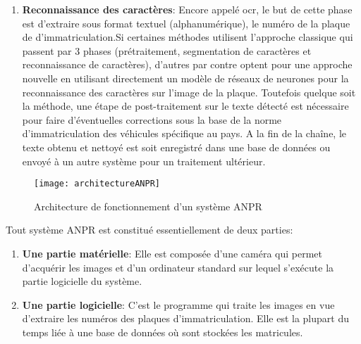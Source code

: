 \begin{enumerate}
\begin{itemize}
        \end{itemize}
    \item \textbf{Reconnaissance des caractères}: Encore appelé \acrshort{ocr}, le but de cette phase est d’extraire sous format textuel (alphanumérique), le numéro de la plaque de d’immatriculation.Si certaines méthodes \cite{krimMaster} \cite{10.1155/2018/6737314} utilisent l'approche classique qui passent par 3 phases (prétraitement, segmentation de caractères et reconnaissance de caractères), d’autres \cite{Alahyane2021OpenDF} \cite{doi:10.1177/0361198120954202} par contre optent pour une approche nouvelle en utilisant directement un modèle de réseaux de neurones pour la reconnaissance des caractères sur l'image de la plaque. Toutefois quelque soit la méthode, une étape de post-traitement sur le texte détecté est nécessaire pour faire d'éventuelles corrections sous la base de la norme d’immatriculation des véhicules spécifique au pays. A la fin de la chaîne, le texte obtenu et nettoyé est soit enregistré dans une base de données ou envoyé à un autre système pour un traitement ultérieur.

\end{enumerate}

\begin{figure}[H]
    \centering
    \texttt{[image: architectureANPR]}
    \caption{Architecture de fonctionnement d'un système ANPR}
\end{figure}
Tout système ANPR est constitué essentiellement de deux parties:
    \begin{enumerate}
        \item \textbf{Une partie matérielle}: Elle est composée d’une caméra qui permet d’acquérir les images et d’un ordinateur standard sur lequel s'exécute la partie logicielle du système.
        \item \textbf{Une partie logicielle}: C’est le programme qui traite les images en vue d’extraire les numéros des plaques d’immatriculation. Elle est la plupart du temps liée à une base de données où sont stockées les matricules.
    \end{enumerate}